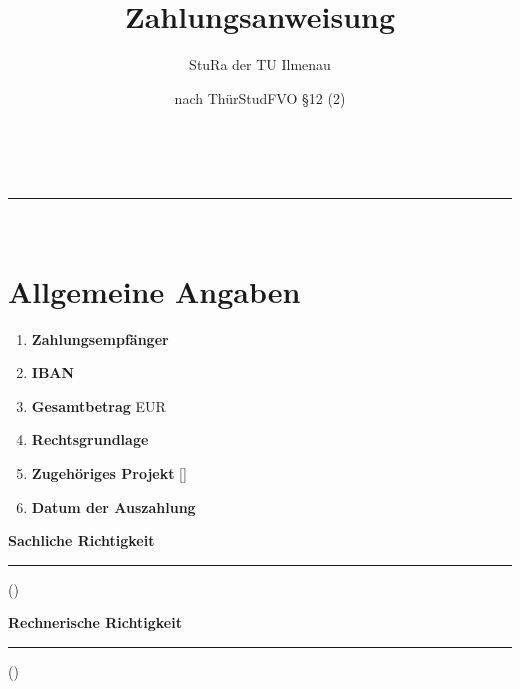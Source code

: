 \documentclass[a4paper,11pt]{article}
\makeatletter
\newcommand{\linia}{\rule{\linewidth}{0.5pt}}
\theoremstyle{mytheor}
\renewcommand{\maketitle}{
\begin{center}
\vspace{2ex}
{\huge \textsc{\@title}}
\vspace{1ex}
\\
\linia\\
\@author \hfill \@date
\vspace{4ex}
\end{center}
}
\makeatother
\begin{document}
\title{Zahlungsanweisung}

\author{StuRa der TU Ilmenau}

\date{nach ThürStudFVO §12 (2)}

\maketitle

\section{Allgemeine Angaben}

\begin{enumerate}[I]
\item \textbf{Zahlungsempfänger}\hfill \empfaenger
\item \textbf{IBAN} \hfill\iban
\item \textbf{Gesamtbetrag} \hfill\betrag{} EUR
\item \textbf{Rechtsgrundlage} \hfill {}
\item \textbf{Zugehöriges Projekt} \hfill [\projektid] \projektname
\item \textbf{Datum der Auszahlung} \hfill {}
\end{enumerate}
\vspace{1cm}
\parbox[b]{0.4\linewidth}{%
    \strut 
    \textbf{Sachliche Richtigkeit} \\[1.25cm]%
    \hrule
    \vspace{0.25cm}
    ()} 
\hspace{1cm} %
\parbox[b]{0.4\linewidth}{%
    \strut 
    \textbf{Rechnerische Richtigkeit} \\[1.25cm]%
    \hrule 
    \vspace{0.25cm}
    ()}
    \par\vspace{1cm} 

\end{document}
